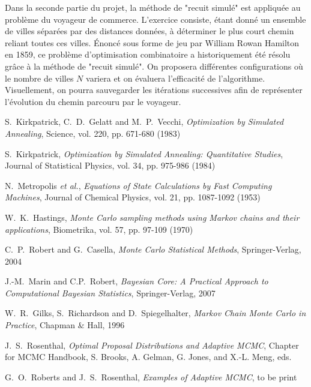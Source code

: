 \documentclass[10pt,a4paper,twoside]{report}
\begin{document}
Dans la seconde partie du projet, la méthode de "recuit simulé" est
appliquée au problème du voyageur de commerce. L'exercice consiste,
étant donné un ensemble de villes séparées par des distances données,
à déterminer le plus court chemin reliant toutes ces villes. \'Enoncé
sous forme de jeu par William Rowan Hamilton en 1859, ce problème
d'optimisation combinatoire a historiquement été résolu grâce à la
méthode de "recuit simulé". On proposera différentes configurations où
le nombre de villes $N$ variera et on évaluera l'efficacité de
l'algorithme. Visuellement, on pourra sauvegarder les itérations
successives afin de représenter l'évolution du chemin parcouru par le
voyageur.

\def\etal{\textit{et al.}}

\renewcommand{\bibname}{References}

\begin{thebibliography}{9}
  

 S.~Kirkpatrick, C.~D.~Gelatt and M.~P.~Vecchi, {\em
  Optimization by Simulated Annealing}, Science, vol. 220, pp. 671-680 (1983)

 S.~Kirkpatrick, {\em Optimization by Simulated
  Annealing: Quantitative Studies}, Journal of Statistical Physics,
  vol. 34, pp. 975-986 (1984)

 N.~Metropolis \etal, {\em Equations of State
  Calculations by Fast Computing Machines}, Journal of Chemical
  Physics, vol. 21, pp. 1087-1092 (1953)

 W.~K.~Hastings, {\em Monte Carlo sampling methods
  using Markov chains and their applications}, Biometrika, vol. 57,
  pp. 97-109 (1970)

 C.~P.~Robert and G.~Casella, {\em Monte Carlo
  Statistical Methods}, Springer-Verlag, 2004

 J.-M.~Marin and C.P.~Robert, {\em Bayesian Core: A
  Practical Approach to Computational Bayesian Statistics},
  Springer-Verlag, 2007

 W.~R.~Gilks, S.~Richardson and D.~Spiegelhalter, {\em
  Markov Chain Monte Carlo in Practice}, Chapman \& Hall, 1996

 J.~S.~Rosenthal, {\em Optimal Proposal
  Distributions and Adaptive MCMC}, Chapter for MCMC Handbook,
  S. Brooks, A. Gelman, G. Jones, and X.-L. Meng, eds.

 G.~O.~Roberts and J.~S.~Rosenthal, {\em Examples of
  Adaptive MCMC}, to be print


\end{thebibliography}
\end{document}
